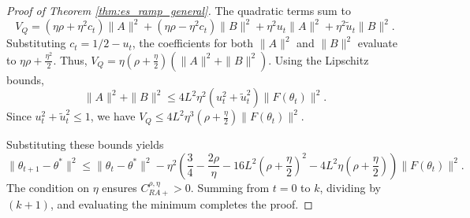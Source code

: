 \documentclass[10pt,a4paper]{amsart}
\begin{document}
\begin{proof}[Proof of Theorem \ref{thm:es_ramp_general}]
The quadratic terms sum to 
\begin{equation}
 V_Q = (\eta\rho + \eta^2 c_t)\|A\|^2 + (\eta\rho - \eta^2 c_t)\|B\|^2 + \eta^2 u_t \|A\|^2 + \eta^2 \tilde{u}_t \|B\|^2.
\end{equation}
Substituting $c_t = 1/2 - u_t$, the coefficients for both $\|A\|^2$ and $\|B\|^2$ evaluate to $\eta\rho + \frac{\eta^2}{2}$. Thus, $V_Q = \eta(\rho + \frac{\eta}{2})(\|A\|^2 + \|B\|^2)$. Using the Lipschitz bounds, 
\begin{equation}
 \|A\|^2 + \|B\|^2 \le 4L^2\eta^2 (u_t^2 + \tilde{u}_t^2) \|F(\theta_t)\|^2.
\end{equation}
Since $u_t^2 + \tilde{u}_t^2 \le 1$, we have $V_Q \le 4L^2\eta^3(\rho + \frac{\eta}{2}) \|F(\theta_t)\|^2$.

Substituting these bounds yields
\begin{equation}
\|\theta_{t+1} - \theta^*\|^2 \le \|\theta_t - \theta^*\|^2 - \eta^2 \left( \frac{3}{4} - \frac{2\rho}{\eta} - 16L^2\left(\rho + \frac{\eta}{2}\right)^2 - 4L^2\eta\left(\rho + \frac{\eta}{2}\right) \right) \|F(\theta_t)\|^2.
\end{equation}
The condition on $\eta$ ensures $C_{RA+}^{\rho,\eta} > 0$. Summing from $t=0$ to $k$, dividing by $(k+1)$, and evaluating the minimum completes the proof.
\end{proof}
\end{document}
